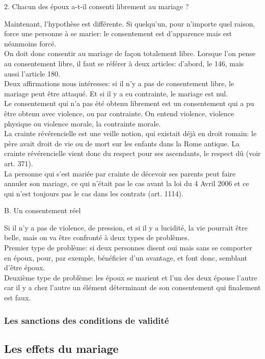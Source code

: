 \documentclass[12pt, a4paper, openany]{book}
\begin{document}
2. Chacun des époux a-t-il consenti librement au mariage ?


Maintenant, l'hypothèse est différente. Si quelqu'un, pour n'importe quel raison, force une personne à se marier: le consentement est d'apparence mais est néanmoins forcé. \\
On doit donc consentir au mariage de façon totalement libre. Lorsque l'on pense au consentement libre, il faut se référer à deux articles: d'abord, le 146, mais aussi l'article 180. \\
Deux affirmations nous intéresses: si il n'y a pas de consentement libre, le mariage peut être attaqué. Et si il y a eu contrainte, le mariage est nul. \\
Le consentement qui n'a pas été obtenu librement est un consentement qui a pu être obtenu avec violence, ou par contrainte. On entend violence, violence physique ou violence morale, la contrainte morale. \\
La crainte révérencielle est une veille notion, qui existait déjà en droit romain: le père avait droit de vie ou de mort sur les enfants dans la Rome antique. La crainte révérencielle vient donc du respect pour ses ascendants, le respect dû (voir art. 371). \\
La personne qui s'est mariée par crainte de décevoir ses parents peut faire annuler son mariage, ce qui n'était pas le cas avant la loi du 4 Avril 2006 et ce qui n'est toujours pas le cas dans les contrats (art. 1114). 


B. Un consentement réel 


Si il n'y a pas de violence, de pression, et si il y a lucidité, la vie pourrait être belle, mais on va être confronté à deux types de problèmes. \\
Premier type de problème: si deux personnes disent oui mais sans se comporter en époux, pour, par exemple, bénéficier d'un avantage, et font donc, semblant d'être époux. \\
Deuxième type de problème: les époux se marient et l'un des deux épouse l'autre car il y a chez l'autre un élément déterminant de son consentement qui finalement est faux. 





\subsubsection{Les sanctions des conditions de validité}


\subsection{Les effets du mariage}
\end{document}
